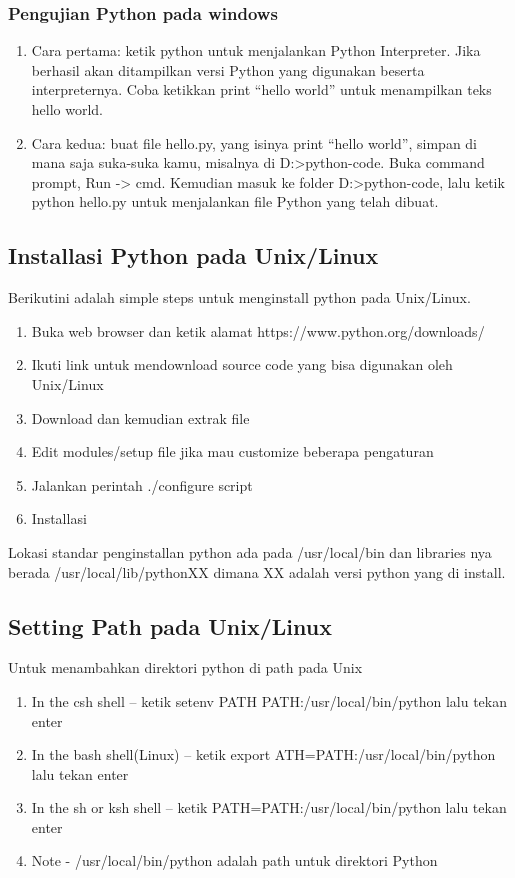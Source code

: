 \subsubsection{Pengujian Python pada windows}
	\begin{enumerate}
	\item Cara pertama: ketik python untuk menjalankan Python Interpreter. 
	      Jika berhasil akan ditampilkan versi Python yang digunakan beserta interpreternya. 
	      Coba ketikkan print “hello world” untuk menampilkan teks hello world.
	\item Cara kedua: buat file hello.py, yang isinya print “hello world”, 
	      simpan di mana saja suka-suka kamu, misalnya di D:>python-code. Buka command prompt, Run -> cmd. 
	      Kemudian masuk ke folder D:>python-code, lalu ketik python hello.py untuk menjalankan file Python yang telah dibuat.
	\end{enumerate}

\subsection{Installasi Python pada Unix/Linux}
	Berikutini adalah simple steps untuk menginstall python pada Unix/Linux.
	\begin{enumerate}
	\item Buka web browser dan ketik alamat https://www.python.org/downloads/
	\item Ikuti link untuk mendownload source code yang bisa digunakan oleh Unix/Linux
	\item Download dan kemudian extrak file
	\item Edit modules/setup file jika mau customize beberapa pengaturan
	\item Jalankan perintah ./configure script
	\item Installasi 
	\end{enumerate}
Lokasi standar penginstallan python ada pada /usr/local/bin dan libraries nya berada 
/usr/local/lib/pythonXX dimana XX adalah versi python yang di install.

\subsection{Setting Path pada Unix/Linux}
Untuk menambahkan direktori python di path pada Unix
\begin{enumerate}
\item In the csh shell – ketik setenv PATH PATH:/usr/local/bin/python lalu tekan enter
\item In the bash shell(Linux) – ketik export ATH=PATH:/usr/local/bin/python lalu tekan enter
\item In the sh or ksh shell – ketik PATH=PATH:/usr/local/bin/python lalu tekan enter
\item Note - /usr/local/bin/python adalah path untuk direktori Python
\end{enumerate}

